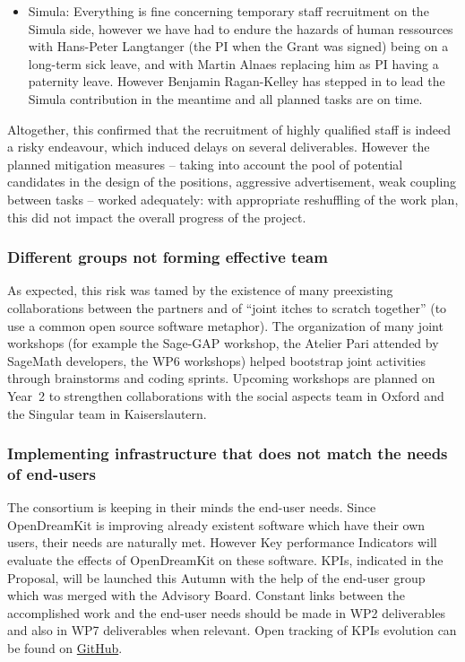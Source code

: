 \begin{itemize}
\item{Simula:} Everything is fine concerning temporary staff
  recruitment on the Simula side, however we have had to endure the
  hazards of human ressources with Hans-Peter Langtanger (the PI when
  the Grant was signed) being on a long-term sick leave, and with
  Martin Alnaes replacing him as PI having a paternity leave. However
  Benjamin Ragan-Kelley has stepped in to lead the
  Simula contribution in the meantime and all planned tasks are on time.\\
\end{itemize}


Altogether, this confirmed that the recruitment of highly
qualified staff is indeed a risky endeavour, which induced delays on
several deliverables. However the planned mitigation measures --
taking into account the pool of potential candidates in the design of
the positions, aggressive advertisement, weak coupling between tasks
-- worked adequately: with appropriate reshuffling of the work plan,
this did not impact the overall progress of the project.

\subsubsection{Different groups not forming effective team}

As expected, this risk was tamed by the existence of many preexisting
collaborations between the partners and of ``joint itches to scratch
together'' (to use a common open source software metaphor). The
organization of many joint workshops (for example the Sage-GAP
workshop, the Atelier Pari attended by SageMath developers, the WP6
workshops) helped bootstrap joint activities through brainstorms and
coding sprints. Upcoming workshops are planned on Year~2 to strengthen
collaborations with the social aspects team in Oxford and the Singular
team in Kaiserslautern.


\subsubsection{Implementing infrastructure that does not match the needs of end-users}

The consortium is keeping in their minds the end-user needs. Since
OpenDreamKit is improving already existent software which have their
own users, their needs are naturally met. However Key performance
Indicators will evaluate the effects of OpenDreamKit on these
software. KPIs, indicated in the Proposal, will be launched this
Autumn with the help of the end-user group which was merged with the
Advisory Board. Constant links between the accomplished work and the
end-user needs should be made in WP2 deliverables and also in WP7
deliverables when relevant.  Open tracking of KPIs evolution can be
found on
\href{https://github.com/OpenDreamKit/OpenDreamKit/labels/KPI}{GitHub}.

